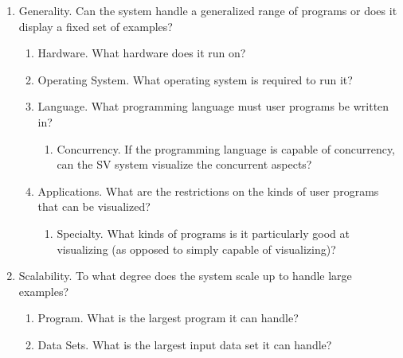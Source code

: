\begin{enumerate}
  \item Generality. Can the system handle a generalized range of programs or
  does it display a fixed set of examples?
  \begin{enumerate}
    \item Hardware. What hardware does it run on?
    \item Operating System. What operating system is required to run it?
    \item Language. What programming language must user programs be written
    in?
    \begin{enumerate}
      \item Concurrency. If the programming language is capable of
      concurrency, can the SV system visualize the concurrent aspects?
    \end{enumerate}
    \item Applications. What are the restrictions on the kinds of user
    programs that can be visualized?
    \begin{enumerate}
      \item Specialty. What kinds of programs is it particularly good at
      visualizing (as opposed to simply capable of visualizing)?
    \end{enumerate}
  \end{enumerate}
  \item Scalability. To what degree does the system scale up to handle large
  examples?
  \begin{enumerate}
    \item Program. What is the largest program it can handle?
    \item Data Sets. What is the largest input data set it can handle?
  \end{enumerate}
\end{enumerate}



